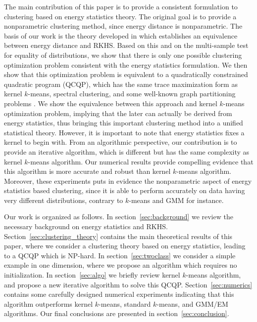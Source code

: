 \documentclass[aps,preprint,nofootinbib,floatfix]{revtex4-1}
\begin{document}
The main contribution of this paper is to provide a consistent formulation
to clustering based on energy statistics theory. 
The original goal is to provide a nonparametric
clustering method, since energy distance is nonparametric.
The basis of our work is the theory developed in 
\cite{Sejdinovic2013} which establishes an equivalence between energy
distance and RKHS. 
Based on this and on the multi-sample test
for equality of distributions, we show that
there is only one possible clustering optimization
problem consistent with the energy statistics formulation. 
We then show that this 
optimization problem is equivalent to a quadratically constrained quadratic
program (QCQP), which has the same trace maximization
form as kernel $k$-means,
spectral clustering, and some well-known graph partitioning problems
\cite{Dhillon2,Dhillon}. We show the equivalence between this approach
and kernel $k$-means optimization problem, implying that
the later can actually be derived from energy statistics, thus
bringing this important clustering method into a unified statistical theory.
However, it is important to note that 
energy statistics fixes a kernel to begin with.
From an algorithmic perspective, our contribution is to 
provide an iterative algorithm, which is different but has the same
complexity as kernel $k$-means algorithm. Our numerical results
provide compelling evidence that this algorithm 
is more accurate and robust than kernel $k$-means algorithm.
Moreover, these experiments 
puts in evidence the nonparametric aspect of energy
statistics based clustering, since it is able to perform accurately
on data having very different distributions, contrary to $k$-means and
GMM for instance.

Our work is organized as follows. In section~\ref{sec:background} we review
the necessary background on energy statistics and RKHS.
Section~\ref{sec:clustering_theory} contains the main theoretical 
results of this paper,
where we consider a clustering theory based on energy statistics, leading
to a QCQP which is NP-hard.
In section~\ref{sec:twoclass} we consider a simple example in one dimension,
where we propose an algorithm which requires no initialization.
In section~\ref{sec:algo} we briefly review kernel $k$-means algorithm,
and propose a new iterative algorithm to solve this QCQP.
Section~\ref{sec:numerics} contains some carefully designed numerical
experiments indicating that this algorithm outperforms kernel
$k$-means, standard $k$-means, and GMM/EM algorithms.
Our final conclusions are presented in section~\ref{sec:conclusion}.
\end{document}
